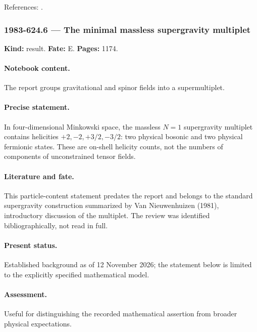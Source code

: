 \noindent References: \citep{vannieuwenhuizen1981supergravity}.\par

\subsubsection{1983-624.6 --- The minimal massless supergravity multiplet}

\label{item:1983-624.6}

\noindent\textbf{Kind:} result. \textbf{Fate:} E. \textbf{Pages:} 1174.\par

\paragraph{Notebook content.} The report groups gravitational and spinor fields into a supermultiplet.

\paragraph{Precise statement.} In four-dimensional Minkowski space, the massless \(N=1\) supergravity multiplet contains helicities \(+2,-2,+3/2,-3/2\): two physical bosonic and two physical fermionic states. These are on-shell helicity counts, not the numbers of components of unconstrained tensor fields.

\paragraph{Literature and fate.} This particle-content statement predates the report and belongs to the standard supergravity construction summarized by Van Nieuwenhuizen (1981), introductory discussion of the multiplet. The review was identified bibliographically, not read in full.

\paragraph{Present status.} Established background as of 12 November 2026; the statement below is limited to the explicitly specified mathematical model.

\paragraph{Assessment.} Useful for distinguishing the recorded mathematical assertion from broader physical expectations.

